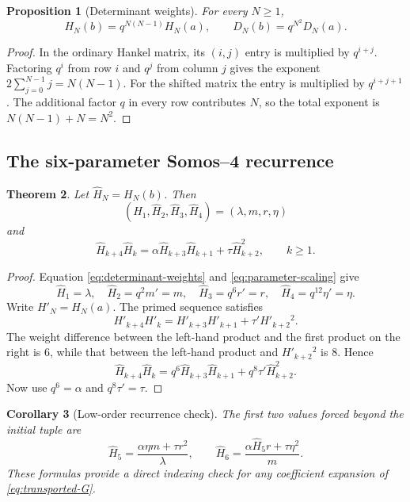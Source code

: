 \documentclass[11pt]{article}
\newtheorem{theorem}{Theorem}
\newtheorem{proposition}[theorem]{Proposition}
\newtheorem{corollary}[theorem]{Corollary}
\theoremstyle{definition}
\theoremstyle{remark}
\newcommand{\Ha}{\widehat H}
\begin{document}
\begin{proposition}[Determinant weights]
For every $N\geq1$,
\begin{equation}
 H_N(b)=q^{N(N-1)}H_N(a),\qquad
 D_N(b)=q^{N^2}D_N(a).
 \label{eq:determinant-weights}
\end{equation}
\end{proposition}
\begin{proof}
In the ordinary Hankel matrix, its $(i,j)$ entry is multiplied by $q^{i+j}$.
Factoring $q^i$ from row $i$ and $q^j$ from column $j$ gives the exponent
$2\sum_{j=0}^{N-1}j=N(N-1)$.  For the shifted matrix the entry is multiplied
by $q^{i+j+1}$.  The additional factor $q$ in every row contributes $N$, so
the total exponent is $N(N-1)+N=N^2$.
\end{proof}

\subsection{The six-parameter Somos--4 recurrence}
\begin{theorem}
Let $\Ha_N=H_N(b)$.  Then
\[
 (\Ha_1,\Ha_2,\Ha_3,\Ha_4)=(\lambda,m,r,\eta)
\]
and
\begin{equation}
 \Ha_{k+4}\Ha_k
 =\alpha\Ha_{k+3}\Ha_{k+1}+\tau\Ha_{k+2}^2,
 \qquad k\geq1.
 \label{eq:transported-recurrence}
\end{equation}
\end{theorem}
\begin{proof}
Equation \eqref{eq:determinant-weights} and
\eqref{eq:parameter-scaling} give
\[
 \Ha_1=\lambda,
 \quad \Ha_2=q^2m'=m,
 \quad \Ha_3=q^6r'=r,
 \quad \Ha_4=q^{12}\eta'=\eta.
\]
Write $H'_N=H_N(a)$.  The primed sequence satisfies
\[
 H'_{k+4}H'_k=H'_{k+3}H'_{k+1}+\tau'H'_{k+2}{}^2.
\]
The weight difference between the left-hand product and the first product on
the right is $6$, while that between the left-hand product and
$H'_{k+2}{}^2$ is $8$.  Hence
\[
 \Ha_{k+4}\Ha_k
 =q^6\Ha_{k+3}\Ha_{k+1}+q^8\tau'\Ha_{k+2}^2.
\]
Now use $q^6=\alpha$ and $q^8\tau'=\tau$.
\end{proof}

\begin{corollary}[Low-order recurrence check]
The first two values forced beyond the initial tuple are
\[
 \Ha_5=\frac{\alpha\eta m+\tau r^2}{\lambda},
\qquad
 \Ha_6=\frac{\alpha\Ha_5r+\tau\eta^2}{m}.
\]
These formulas provide a direct indexing check for any coefficient expansion
of \eqref{eq:transported-G}.
\end{corollary}
\end{document}
